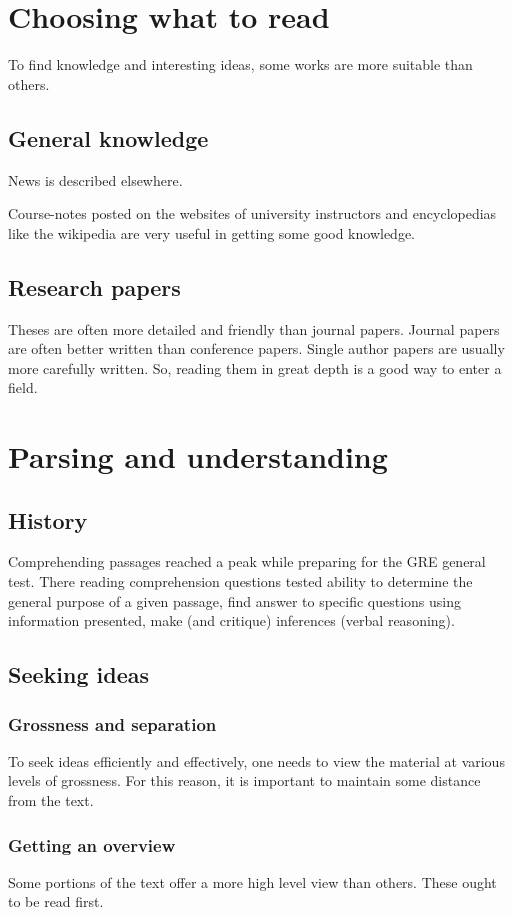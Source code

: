 \documentclass[oneside, article]{memoir}
\begin{document}
\section{Choosing what to read}
To find knowledge and interesting ideas, some works are more suitable than others.

\subsection{General knowledge}
News is described elsewhere.

Course-notes posted on the websites of university instructors and encyclopedias like the wikipedia are very useful in getting some good knowledge.

\subsection{Research papers}
Theses are often more detailed and friendly than journal papers. Journal papers are often better written than conference papers. Single author papers are usually more carefully written. So, reading them in great depth is a good way to enter a field.

\section{Parsing and understanding}
\subsection{History}
Comprehending passages reached a peak while preparing for the GRE general test. There reading comprehension questions tested ability to determine the general purpose of a given passage, find answer to specific questions using information presented, make (and critique) inferences (verbal reasoning).

\subsection{Seeking ideas}
\subsubsection{Grossness and separation}
To seek ideas efficiently and effectively, one needs to view the material at various levels of grossness. For this reason, it is important to maintain some distance from the text.

\subsubsection{Getting an overview}
Some portions of the text offer a more high level view than others. These ought to be read first.
\end{document}
